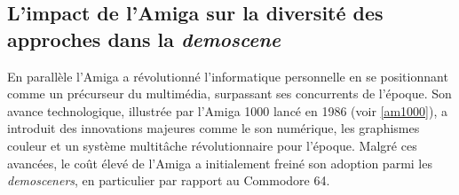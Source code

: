 \subsection*{L'impact de l'Amiga sur la diversité des approches dans la \textit{demoscene}}

En parallèle l'Amiga a révolutionné l'informatique personnelle en se positionnant comme un précurseur du multimédia, surpassant ses concurrents de l'époque. Son avance technologique, illustrée par l'Amiga 1000 lancé en 1986 (voir \ref{am1000}), a introduit des innovations majeures comme le son numérique, les graphismes couleur et un système multitâche révolutionnaire pour l'époque. Malgré ces avancées, le coût élevé de l'Amiga a initialement freiné son adoption parmi les \textit{demosceners}, en particulier par rapport au Commodore 64.

